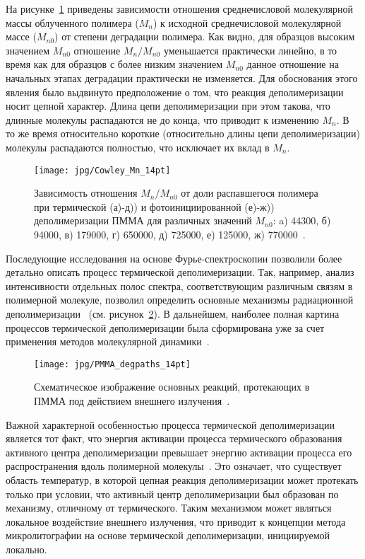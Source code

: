 На рисунке~\ref{fig:Cowley_Mn} приведены зависимости отношения среднечисловой молекулярной массы облученного полимера ($M_n$) к исходной среднечисловой молекулярной массе ($M_{n0}$) от степени деградации полимера. Как видно, для образцов высоким значением $M_{n0}$ отношение $M_n / M_{n0}$ уменьшается практически линейно, в то время как для образцов с более низким значением $M_{n0}$ данное отношение на начальных этапах деградации практически не изменяется. Для обоснования этого явления было выдвинуто предположение о том, что реакция деполимеризации носит цепной характер. Длина цепи деполимеризации при этом такова, что длинные молекулы распадаются не до конца, что приводит к изменению $M_n$. В то же время относительно короткие (относительно длины цепи деполимеризации) молекулы распадаются полностью, что исключает их вклад в $M_n$.

\begin{figure}
	\centering
	\texttt{[image: jpg/Cowley\_Mn\_14pt]}
	\caption{Зависимость отношения $M_n / M_{n0}$ от доли распавшегося полимера при термической (а)-д)) и фотоинициированной (е)-ж)) деполимеризации ПММА для различных значений $M_{n0}$: a) 44300, б) 94000, в) 179000, г) 650000, д) 725000, е) 125000, ж) 770000~\cite{Cowley_1952_1}.}
	\label{fig:Cowley_Mn}
\end{figure}

Последующие исследования на основе Фурье-спектроскопии позволили более детально описать процесс термической деполимеризации. Так, например, анализ интенсивности отдельных полос спектра, соответствующим различным связям в полимерной молекуле, позволил определить основные механизмы радиационной деполимеризации~\cite{Bermudez} (см. рисунок~\ref{fig:PMMA_degpaths}). В дальнейшем, наиболее полная картина процессов термической деполимеризации была сформирована уже за счет применения методов молекулярной динамики~\cite{Stoliarov}.

\begin{figure}
	\centering
	\texttt{[image: jpg/PMMA\_degpaths\_14pt]}
	\caption{Схематическое изображение основных реакций, протекающих в ПММА под действием внешнего излучения~\cite{Bermudez}.}
	\label{fig:PMMA_degpaths}
\end{figure}

Важной характерной особенностью процесса термической деполимеризации является тот факт, что энергия активации процесса термического образования активного центра деполимеризации превышает энергию активации процесса его распространения вдоль полимерной молекулы~\cite{Cowley_1952_1, Sanchez-Jimenez_Ea}. Это означает, что существует область температур, в которой цепная реакция деполимеризации может протекать только при условии, что активный центр деполимеризации был образован по механизму, отличному от термического. Таким механизмом может являться локальное воздействие внешнего излучения, что приводит к концепции метода микролитографии на основе термической деполимеризации, инициируемой локально.

